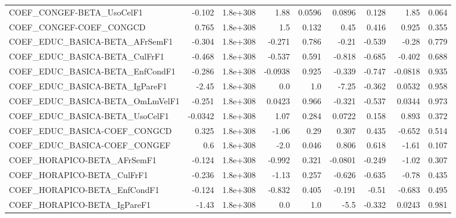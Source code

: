 \begin{tabular}{lrrrrrrrr}
COEF\_CONGEF-BETA\_UsoCelF1             &      -0.102 &     1.8e+308 &    1.88 &   0.0596 &     0.0896 &       0.128 &         1.85 &         0.064 \\
COEF\_CONGEF-COEF\_CONGCD               &       0.765 &     1.8e+308 &     1.5 &    0.132 &       0.45 &       0.416 &        0.925 &         0.355 \\
COEF\_EDUC\_BASICA-BETA\_AFrSemF1        &      -0.304 &     1.8e+308 &  -0.271 &    0.786 &      -0.21 &      -0.539 &        -0.28 &         0.779 \\
COEF\_EDUC\_BASICA-BETA\_CulFrF1         &      -0.468 &     1.8e+308 &  -0.537 &    0.591 &     -0.818 &      -0.685 &       -0.402 &         0.688 \\
COEF\_EDUC\_BASICA-BETA\_EnfCondF1       &      -0.286 &     1.8e+308 & -0.0938 &    0.925 &     -0.339 &      -0.747 &      -0.0818 &         0.935 \\
COEF\_EDUC\_BASICA-BETA\_IgPareF1        &       -2.45 &     1.8e+308 &     0.0 &      1.0 &      -7.25 &      -0.362 &       0.0532 &         0.958 \\
COEF\_EDUC\_BASICA-BETA\_OmLmVelF1       &      -0.251 &     1.8e+308 &  0.0423 &    0.966 &     -0.321 &      -0.537 &       0.0344 &         0.973 \\
COEF\_EDUC\_BASICA-BETA\_UsoCelF1        &     -0.0342 &     1.8e+308 &    1.07 &    0.284 &     0.0722 &       0.158 &        0.893 &         0.372 \\
COEF\_EDUC\_BASICA-COEF\_CONGCD          &       0.325 &     1.8e+308 &   -1.06 &     0.29 &      0.307 &       0.435 &       -0.652 &         0.514 \\
COEF\_EDUC\_BASICA-COEF\_CONGEF          &         0.6 &     1.8e+308 &    -2.0 &    0.046 &      0.806 &       0.618 &        -1.61 &         0.107 \\
COEF\_HORAPICO-BETA\_AFrSemF1           &      -0.124 &     1.8e+308 &  -0.992 &    0.321 &    -0.0801 &      -0.249 &        -1.02 &         0.307 \\
COEF\_HORAPICO-BETA\_CulFrF1            &      -0.236 &     1.8e+308 &   -1.13 &    0.257 &     -0.626 &      -0.635 &        -0.78 &         0.435 \\
COEF\_HORAPICO-BETA\_EnfCondF1          &      -0.124 &     1.8e+308 &  -0.832 &    0.405 &     -0.191 &       -0.51 &       -0.683 &         0.495 \\
COEF\_HORAPICO-BETA\_IgPareF1           &       -1.43 &     1.8e+308 &     0.0 &      1.0 &       -5.5 &      -0.332 &       0.0243 &         0.981 \\

\end{tabular}
